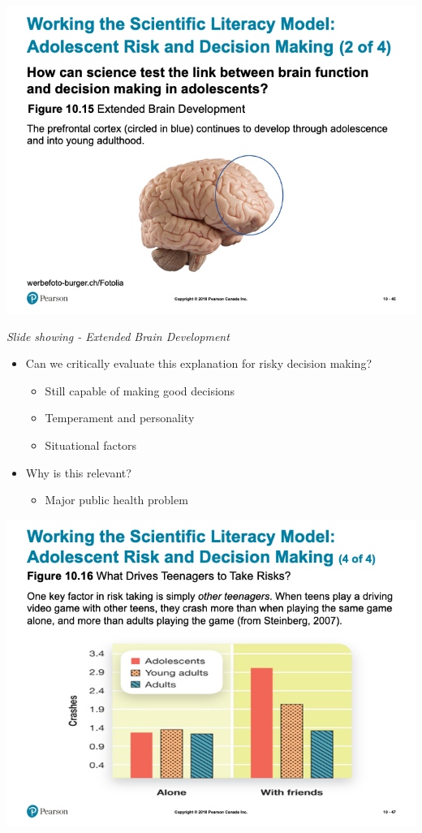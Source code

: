 \documentclass[
]{book}
\providecommand{\tightlist}{%
  \setlength{\itemsep}{0pt}\setlength{\parskip}{0pt}}
\begin{document}
\begin{reflect}
\includegraphics{assets/unit_3/slide_45.png}

\emph{Slide showing - Extended Brain Development}

\begin{itemize}
\tightlist
\item
  Can we critically evaluate this explanation for risky decision making?

  \begin{itemize}
  \tightlist
  \item
    Still capable of making good decisions\\
  \item
    Temperament and personality\\
  \item
    Situational factors\\
  \end{itemize}
\item
  Why is this relevant?

  \begin{itemize}
  \tightlist
  \item
    Major public health problem
  \end{itemize}
\end{itemize}

\includegraphics{assets/unit_3/slide_47.png}


\end{reflect}
\end{document}
